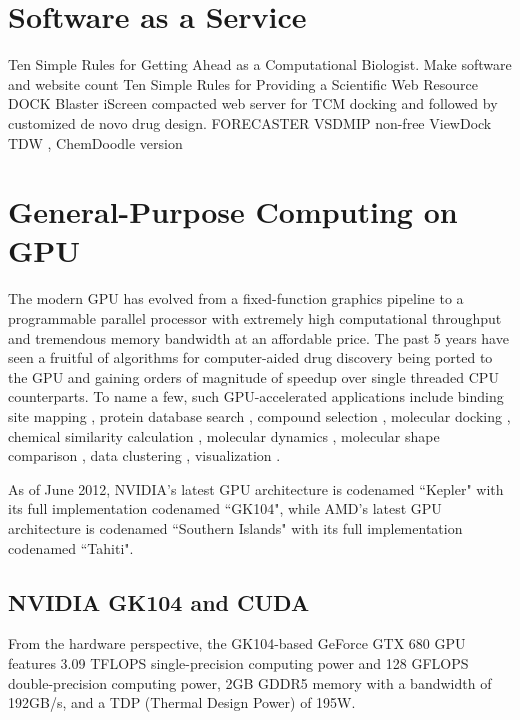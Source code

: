 \section{Software as a Service}

Ten Simple Rules for Getting Ahead as a Computational Biologist. Make software and website count \citep{260}
Ten Simple Rules for Providing a Scientific Web Resource \citep{677}
DOCK Blaster \citep{557}
iScreen \citep{899} compacted web server for TCM docking and followed by customized de novo drug design.
FORECASTER \citep{1012}
VSDMIP \citep{848} non-free
ViewDock TDW \citep{559}, ChemDoodle version

\section{General-Purpose Computing on GPU}

The modern GPU has evolved from a fixed-function graphics pipeline to a programmable parallel processor with extremely high computational throughput and tremendous memory bandwidth at an affordable price. The past 5 years have seen a fruitful of algorithms for computer-aided drug discovery being ported to the GPU and gaining orders of magnitude of speedup over single threaded CPU counterparts. To name a few, such GPU-accelerated applications include binding site mapping \citep{722}, protein database search \citep{189}, compound selection \citep{750}, molecular docking \citep{723,652,779,969}, chemical similarity calculation \citep{726,881}, molecular dynamics \citep{373,374}, molecular shape comparison \citep{491}, data clustering \citep{932}, visualization \citep{986}.

As of June 2012, NVIDIA’s latest GPU architecture is codenamed ``Kepler" with its full implementation codenamed ``GK104", while AMD's latest GPU architecture is codenamed ``Southern Islands" with its full implementation codenamed ``Tahiti".

\subsection{NVIDIA GK104 and CUDA}

From the hardware perspective, the GK104-based GeForce GTX 680 GPU features 3.09 TFLOPS single-precision computing power and 128 GFLOPS double-precision computing power, 2GB GDDR5 memory with a bandwidth of 192GB/s, and a TDP (Thermal Design Power) of 195W.

